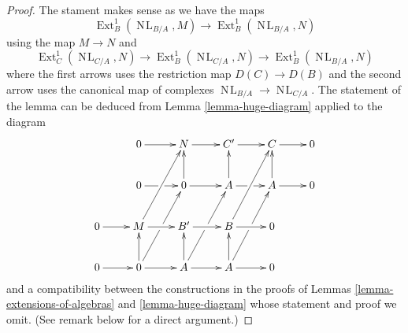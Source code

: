 \documentclass{stacks-project}
\theoremstyle{plain}
\theoremstyle{definition}
\theoremstyle{remark}
\numberwithin{equation}{subsection}
\def\Ext{\mathop{\mathrm{Ext}}\nolimits}
\def\NL{\mathop{N\!L}\nolimits}
\begin{document}
\begin{proof}
The stament makes sense as we have the maps
$$
\Ext^1_B(\NL_{B/A}, M) \to \Ext^1_B(\NL_{B/A}, N)
$$
using the map $M \to N$ and
$$
\Ext^1_C(\NL_{C/A}, N) \to \Ext^1_B(\NL_{C/A}, N) \to \Ext^1_B(\NL_{B/A}, N)
$$
where the first arrows uses the restriction map $D(C) \to D(B)$
and the second arrow uses the canonical map of complexes
$\NL_{B/A} \to \NL_{C/A}$. The statement of the lemma can be deduced from
Lemma \ref{lemma-huge-diagram} applied to the diagram
$$
\xymatrix{
& 0 \ar[r] & N \ar[r] & C' \ar[r] & C \ar[r] & 0 \\
& 0 \ar[r]|\hole & 0 \ar[u] \ar[r] &
A \ar[u] \ar[r]|\hole & A \ar[u] \ar[r] & 0 \\
0 \ar[r] & M \ar[ruu] \ar[r] & B' \ar[r] & B \ar[ruu] \ar[r] & 0 \\
0 \ar[r] & 0 \ar[ruu]|\hole \ar[u] \ar[r] &
A \ar[ruu]|\hole \ar[u] \ar[r] & A \ar[ruu]|\hole \ar[u] \ar[r] & 0
}
$$
and a compatibility between the constructions in the proofs
of Lemmas \ref{lemma-extensions-of-algebras} and \ref{lemma-huge-diagram}
whose statement and proof we omit. (See remark below for a direct argument.)
\end{proof}
\end{document}
